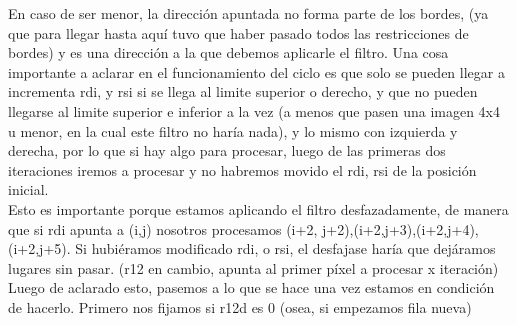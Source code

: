 \documentclass[a4paper]{article}
\begin{document}
        En caso de ser menor, la dirección apuntada no forma parte de los bordes, (ya que para llegar hasta aquí tuvo que haber pasado todos las restricciones de bordes) y es una dirección a la que debemos aplicarle el filtro. \hfill \break
        Una cosa importante a aclarar en el funcionamiento del ciclo es que solo se pueden llegar a incrementa rdi, y rsi si se llega al limite superior o derecho, y que no pueden llegarse al limite superior e inferior a la vez (a menos que pasen una imagen 4x4 u menor, en la cual este filtro no haría nada), y lo mismo con izquierda y derecha,  por lo que si hay algo para procesar, luego de las primeras dos iteraciones iremos a procesar y no habremos movido el rdi, rsi de la posición inicial. \\
        Esto es importante porque estamos aplicando el filtro desfazadamente, de manera que si rdi apunta a (i,j) nosotros procesamos  {(i+2, j+2),(i+2,j+3),(i+2,j+4),(i+2,j+5)}. Si hubiéramos modificado rdi, o rsi, el desfajase haría que dejáramos lugares sin pasar. (r12 en cambio, apunta al primer píxel a procesar x iteración) 
        \hfill \break   
        \\
        Luego de aclarado esto, pasemos a lo que se hace una vez estamos en condición de hacerlo. Primero nos fijamos si r12d es 0 (osea, si empezamos fila nueva)
        \hfill \break
         
\end{document}

